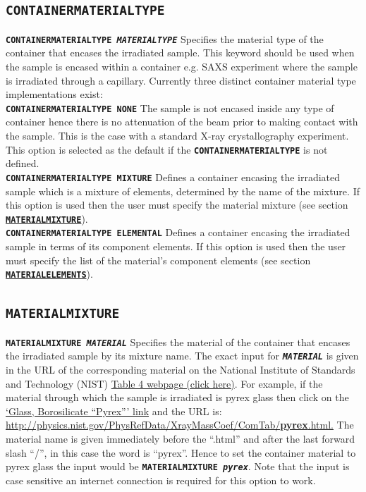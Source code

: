 \documentclass[a4paper]{article}
\newcommand{\Keyword}[1]{\texttt{\textbf{#1}}\xspace}
\newcommand{\SB}{\\[0.2em]}
\begin{document}
\newpage

\subsection{\Keyword{CONTAINERMATERIALTYPE}}

\noindent \Keyword{CONTAINERMATERIALTYPE \textit{MATERIALTYPE}}
Specifies the material type of the container that encases the irradiated sample. This keyword should be used when the sample is encased within a container e.g. SAXS experiment where the sample is irradiated through a capillary. Currently three distinct container material type implementations exist:\SB

\noindent \Keyword{CONTAINERMATERIALTYPE NONE}
The sample is not encased inside any type of container hence there is no attenuation of the beam prior to making contact with the sample. This is the case with a standard X-ray crystallography experiment. This option is selected as the default if the \Keyword{CONTAINERMATERIALTYPE} is not defined.\SB

\noindent \Keyword{CONTAINERMATERIALTYPE MIXTURE}
Defines a container encasing the irradiated sample which is a mixture of elements, determined by the name of the mixture. If this option is used then the user must specify the material mixture (see section \hyperref[materialmixture]{\Keyword{MATERIALMIXTURE}}).\SB

\noindent \Keyword{CONTAINERMATERIALTYPE ELEMENTAL}
Defines a container encasing the irradiated sample in terms of its component elements. If this option is used then the user must specify the list of the material's component elements (see section \hyperref[materialelements]{\Keyword{MATERIALELEMENTS}}).\SB

\subsection{\Keyword{MATERIALMIXTURE}}
\label{materialmixture}
\noindent \Keyword{MATERIALMIXTURE \textit{MATERIAL}}
Specifies the material of the container that encases the irradiated sample by its mixture name. The exact input for \Keyword{\textit{MATERIAL}} is given in the URL of the corresponding material on the National Institute of Standards and Technology (NIST) \href{http://physics.nist.gov/PhysRefData/XrayMassCoef/tab4.html}{Table 4 webpage (click here)}. For example, if the material through which the sample is irradiated is pyrex glass then click on the \href{http://physics.nist.gov/PhysRefData/XrayMassCoef/ComTab/pyrex.html}{`Glass, Borosilicate ``Pyrex''' link} and the URL is:
\newline
\href{http://physics.nist.gov/PhysRefData/XrayMassCoef/ComTab/pyrex.html}{http://physics.nist.gov/PhysRefData/XrayMassCoef/ComTab/\textbf{pyrex}.html.}
\newline
The material name is given immediately before the ``.html'' and after the last forward slash ``/'', in this case the word is ``pyrex''. Hence to set the container material to pyrex glass the input would be \Keyword{MATERIALMIXTURE \textit{pyrex}}. Note that the input is case sensitive an internet connection is required for this option to work.
\end{document}
